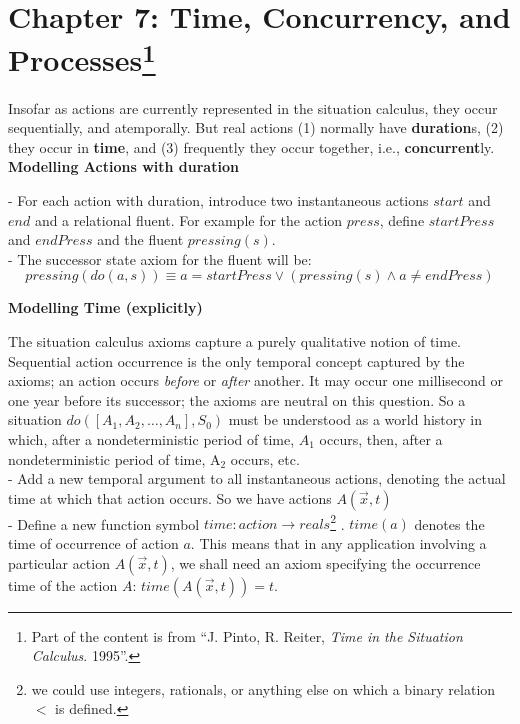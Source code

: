 \documentclass[fleqn]{report}
\begin{document}
\newpage
\section*{Chapter 7: Time, Concurrency, and Processes\footnote{Part of the content is from ``J. Pinto, R. Reiter, \emph{Time in the Situation Calculus}. 1995''.}}
Insofar as actions are currently represented in the situation calculus, they occur sequentially, and atemporally. But real actions (1) normally have \textbf{duration}s, (2) they occur in \textbf{time}, and 
(3) frequently they occur together, i.e., \textbf{concurrent}ly.\\

\textbf{Modelling Actions with duration}

- For each action with duration, introduce two instantaneous actions $start$ and $end$ and a relational fluent. 
For example for the action $press$, define $startPress$ and $endPress$ and the fluent $pressing(s)$. \\
- The successor state axiom for the fluent will be:\vspace{-.3cm}
\[pressing(do(a,s))\equiv a=startPress \lor (pressing(s) \land a\neq endPress) \]

\textbf{Modelling Time (explicitly)}

The situation calculus axioms capture a purely qualitative notion of time. Sequential action occurrence is the only temporal concept captured by the axioms; an action occurs \emph{before} or \emph{after} another. 
It may occur one millisecond or one year before its successor; the axioms are neutral on this question. So a situation $do([A_1, A_2, \ldots , A_n], S_0)$ must be understood as a world history
in which, after a nondeterministic period of time, $A_1$ occurs, then, after a nondeterministic period of time, A$_2$ occurs, etc.\\

- Add a new temporal argument to all instantaneous actions, denoting the actual time at which that action occurs. So we have actions $A(\vec{x},t)$ \\

- Define a new function symbol $time:action\to reals$\footnote{we could use integers, rationals, or anything else on which a binary relation $<$ is defined.} . $time(a)$ denotes the time of occurrence of action $a$. 
This means that in any application involving a particular
action $A(\vec{x},t)$, we shall need an axiom specifying the occurrence time of the action $A$: $time(A(\vec{x},t))=t$.\\
\end{document}
